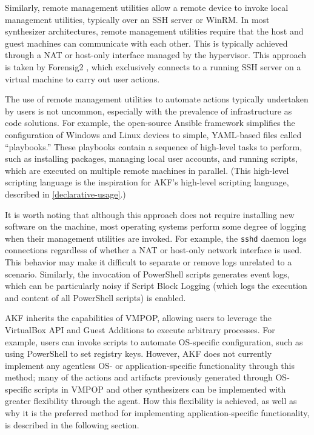 Similarly, remote management utilities allow a remote device to invoke
local management utilities, typically over an SSH server or WinRM. In
most synthesizer architectures, remote management utilities require that
the host and guest machines can communicate with each other. This is
typically achieved through a NAT or host-only interface managed by the
hypervisor. This approach is taken by Forensig2
\cite{mochForensicImageGenerator2009}, which exclusively connects to
a running SSH server on a virtual machine to carry out user actions.

The use of remote management utilities to automate actions typically
undertaken by users is not uncommon, especially with the prevalence of
infrastructure as code solutions. For example, the open-source Ansible
framework simplifies the configuration of Windows and Linux devices to
simple, YAML-based files called ``playbooks.'' These playbooks contain a
sequence of high-level tasks to perform, such as installing packages,
managing local user accounts, and running scripts, which are executed on
multiple remote machines in parallel. (This high-level scripting
language is the inspiration for AKF's high-level scripting language,
described in \autoref{declarative-usage}.)

It is worth noting that although this approach does not require
installing new software on the machine, most operating systems perform
some degree of logging when their management utilities are invoked. For
example, the \passthrough{\lstinline!sshd!} daemon logs connections
regardless of whether a NAT or host-only network interface is used. This
behavior may make it difficult to separate or remove logs unrelated to a
scenario. Similarly, the invocation of PowerShell scripts generates
event logs, which can be particularly noisy if Script Block Logging
(which logs the execution and content of all PowerShell scripts) is
enabled.

AKF inherits the capabilities of VMPOP, allowing users to leverage the
VirtualBox API and Guest Additions to execute arbitrary processes. For
example, users can invoke scripts to automate OS-specific configuration,
such as using PowerShell to set registry keys. However, AKF does not
currently implement any agentless OS- or application-specific
functionality through this method; many of the actions and artifacts
previously generated through OS-specific scripts in VMPOP
\cite{parkTREDEVMPOPCultivating2018} and other synthesizers can be
implemented with greater flexibility through the agent. How this
flexibility is achieved, as well as why it is the preferred method for
implementing application-specific functionality, is described in the
following section.

